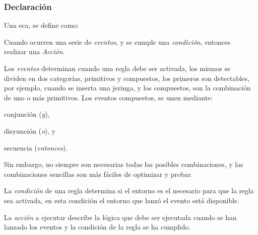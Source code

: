 \subsubsection{Declaración}

Una \gls{eca}, se define como\cite{bailey2004event,behrends2006combining}:

\begin{displayquote}
	 Cuando ocurren una serie de \emph{eventos}, y se cumple una
	 \emph{condición}, entonces realizar una \emph{Acción}.
\end{displayquote}

Los \emph{eventos} determinan cuando una regla debe ser activada, los mismos se
dividen en dos categorías\cite{behrends2006combining}, primitivos y compuestos,
los primeros son detectables, por ejemplo, cuando se inserta una jeringa, y los
compuestos, son la combinación de uno o más
primitivos\cite{bailey2004event,behrends2006combining}. Los eventos
compuestos, se unen mediante:
\begin{enumerate*}[label=\itshape\alph*\upshape)]
\item conjunción (\emph{y}),
\item disyunción (\emph{o}), y
\item secuencia (\emph{entonces}).
\end{enumerate*}
Sin embargo, no siempre son necesarias todas las posibles combinaciones, y las
combinaciones sencillas son más fáciles de optimizar y
probar\cite{bailey2004event}.

La \emph{condición} de una regla determina si el entorno es el necesario para que la
regla sea activada, en esta condición el entorno que lanzó el evento está
disponible.

La \emph{acción} a ejecutar describe la lógica que debe ser ejecutada cuando se han
lanzado los eventos y la condición de la regla se ha cumplido.

